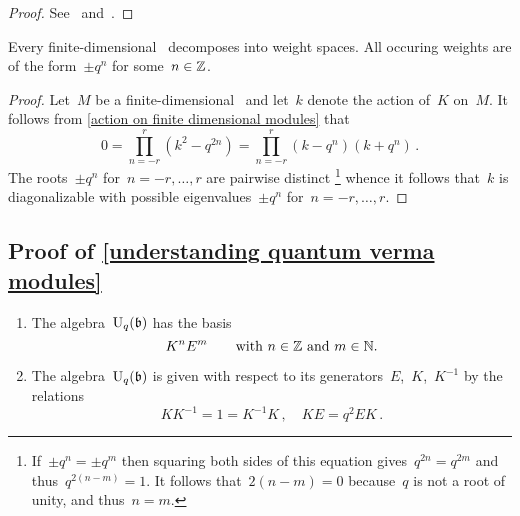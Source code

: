 \documentclass[a4paper, 11pt, oneside]{scrartcl}
\begin{document}
\begin{proof}
  See~\cite[Proposition~2.1]{jantzen_quantum} and~\cite[Proposition~2.3]{jantzen_quantum}.
\end{proof}

\begin{proposition}
  Every finite-dimensional~ decomposes into weight spaces.
  All occuring weights are of the form~$\pm q^n$ for some~$n \in \mathbb{Z}$.
\end{proposition}

\begin{proof}
  Let~$M$ be a finite-dimensional~ and let~$k$ denote the action of~$K$ on~$M$.
  It follows from \cref{action on finite dimensional modules} that
  \[
    0
    =
    \prod_{n = -r}^r ( k^2 - q^{2n} )
    =
    \prod_{n = -r}^r ( k - q^n ) ( k + q^n ) \,.
  \]
  The roots~$\pm q^n$ for~$n = -r, \dotsc, r$ are pairwise distinct%
  \footnote{
    If~$\pm q^n = \pm q^m$ then squaring both sides of this equation gives~$q^{2n} = q^{2m}$ and thus~$q^{2(n-m)} = 1$.
    It follows that~$2(n-m) = 0$ because~$q$ is not a root of unity, and thus~$n = m$.
  }
  whence it follows that~$k$ is diagonalizable with possible eigenvalues~$\pm q^n$ for~$n = -r, \dotsc, r$.
\end{proof}



\subsection{Proof of \cref{understanding quantum verma modules}}
\label{proof of understanding quantum verma modules}

\begin{proposition}
  \label{quantum borel}
  \leavevmode
  \begin{enumerate}
    \item
      The algebra~$\operatorname{U}_q(\mathfrak{b})$ has the basis
      \[
        K^n E^m
        \qquad
        \text{with~$n \in \mathbb{Z}$ and~$m \in \mathbb{N}$.}
      \]
    \item
      The algebra~$\operatorname{U}_q(\mathfrak{b})$ is given with respect to its generators~$E$,~$K$,~$K^{-1}$ by the relations
      \begin{equation}
        \label{defining relations for Uqb}
        K K^{-1} = 1 = K^{-1} K \,,
        \quad
        K E = q^2 E K \,.
      \end{equation}
  \end{enumerate}
\end{proposition}
\end{document}
